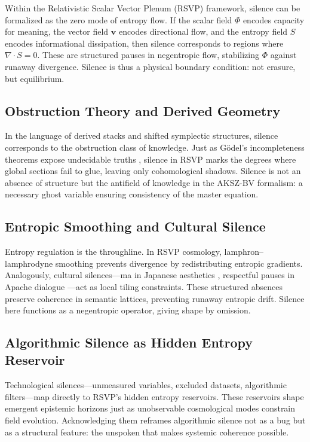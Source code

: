 \documentclass{article}
\begin{document}
Within the Relativistic Scalar Vector Plenum (RSVP) framework, silence can be formalized as the zero mode of entropy flow. If the scalar field $\Phi$ encodes capacity for meaning, the vector field $\mathbf{v}$ encodes directional flow, and the entropy field $S$ encodes informational dissipation, then silence corresponds to regions where $\nabla \cdot S = 0$. These are structured pauses in negentropic flow, stabilizing $\Phi$ against runaway divergence. Silence is thus a physical boundary condition: not erasure, but equilibrium.

\subsection{Obstruction Theory and Derived Geometry}

In the language of derived stacks and shifted symplectic structures, silence corresponds to the obstruction class of knowledge. Just as Gödel’s incompleteness theorems expose undecidable truths \citep{Godel1931}, silence in RSVP marks the degrees where global sections fail to glue, leaving only cohomological shadows. Silence is not an absence of structure but the antifield of knowledge in the AKSZ-BV formalism: a necessary ghost variable ensuring consistency of the master equation.

\subsection{Entropic Smoothing and Cultural Silence}

Entropy regulation is the throughline. In RSVP cosmology, lamphron–lamphrodyne smoothing prevents divergence by redistributing entropic gradients. Analogously, cultural silences—ma in Japanese aesthetics \citep{Isozaki2006}, respectful pauses in Apache dialogue \citep{Basso1970}—act as local tiling constraints. These structured absences preserve coherence in semantic lattices, preventing runaway entropic drift. Silence here functions as a negentropic operator, giving shape by omission.

\subsection{Algorithmic Silence as Hidden Entropy Reservoir}

Technological silences—unmeasured variables, excluded datasets, algorithmic filters—map directly to RSVP’s hidden entropy reservoirs. These reservoirs shape emergent epistemic horizons just as unobservable cosmological modes constrain field evolution. Acknowledging them reframes algorithmic silence not as a bug but as a structural feature: the unspoken that makes systemic coherence possible.
\end{document}
